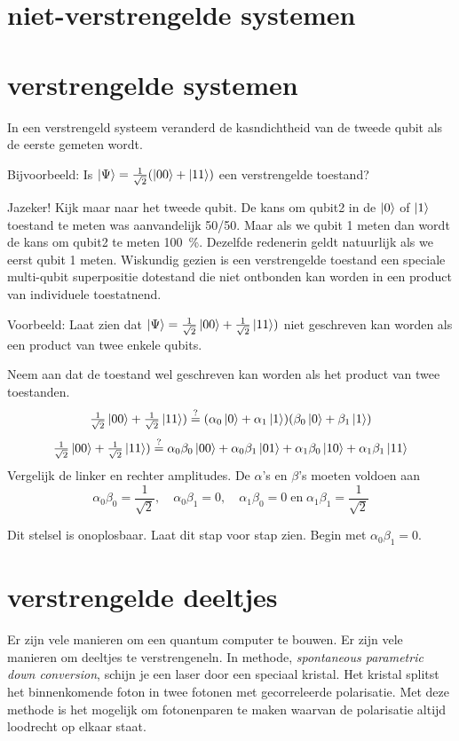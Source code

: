 \documentclass[../../main.tex]{subfiles}
\begin{document}
\section{niet-verstrengelde systemen}

\section{verstrengelde systemen}

In een verstrengeld systeem veranderd de kasndichtheid van de tweede qubit als de eerste gemeten wordt.

Bijvoorbeeld: Is $\ket{\Psi} = \tfrac{1}{\sqrt{2}}(\ket{00}+\ket{11})$ een verstrengelde toestand?

Jazeker! Kijk maar naar het tweede qubit. De kans om qubit2  in de $\ket{0}$ of $\ket{1}$ toestand te meten was aanvandelijk 50/50. Maar als we qubit 1 meten dan wordt de kans om qubit2 te meten \SI{100}{\percent}. Dezelfde redenerin geldt natuurlijk als we eerst qubit 1 meten. Wiskundig gezien is een verstrengelde toestand een speciale multi-qubit superpositie dotestand die niet ontbonden kan worden in een product van individuele toestatnend.

Voorbeeld: Laat zien dat $\ket{\Psi} = \tfrac{1}{\sqrt{2}}\ket{00}+\tfrac{1}{\sqrt{2}}\ket{11})$ niet geschreven kan worden als een product van twee enkele qubits.

Neem aan dat de toestand wel geschreven kan worden als het product van twee toestanden.
$$
\tfrac{1}{\sqrt{2}}\ket{00}+\tfrac{1}{\sqrt{2}}\ket{11}) \stackrel{?}{=} (\alpha_0\ket{0}+\alpha_1\ket{1})(\beta_0\ket{0}+\beta_1\ket{1})$$
$$\tfrac{1}{\sqrt{2}}\ket{00}+\tfrac{1}{\sqrt{2}}\ket{11}) \stackrel{?}{=}\alpha_0\beta_0\ket{00}+
\alpha_0\beta_1\ket{01}+
\alpha_1\beta_0\ket{10}+
\alpha_1\beta_1\ket{11}
$$
Vergelijk de linker en rechter amplitudes. De $\alpha$'s en $\beta$'s moeten voldoen aan
$$
\alpha_0\beta_0 = \frac{1}{\sqrt{2}}, \quad
\alpha_0\beta_1=0, \quad
\alpha_1\beta_0=0\; \textrm{en} \;
\alpha_1\beta_1= \frac{1}{\sqrt{2}}$$

Dit stelsel is onoplosbaar. Laat dit stap voor stap zien. 
Begin met $\alpha_0\beta_1=0$.

\section{verstrengelde deeltjes}
Er zijn vele manieren om een quantum computer te bouwen. Er zijn vele manieren om deeltjes te verstrengeneln. In methode, \textit{spontaneous parametric down conversion}, schijn je een laser door een speciaal kristal. Het kristal splitst het binnenkomende foton in twee fotonen met gecorreleerde polarisatie. Met deze methode is het mogelijk om fotonenparen te maken waarvan de polarisatie altijd loodrecht op elkaar staat.
\end{document}
